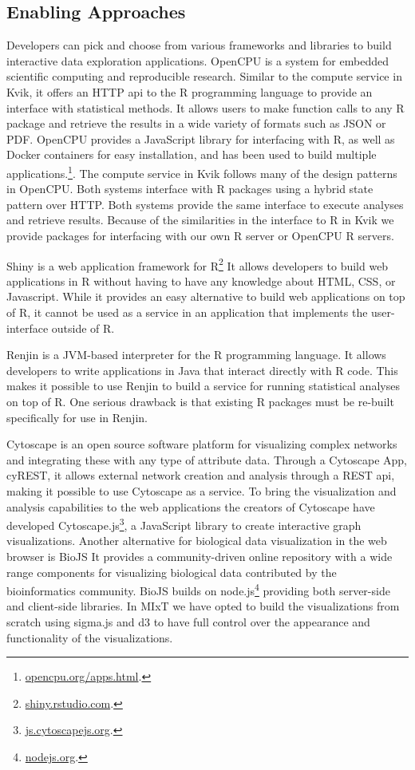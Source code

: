 \subsection{Enabling Approaches} 
Developers can pick and choose from various frameworks and libraries to build
interactive data exploration applications. 
OpenCPU is a system for embedded scientific computing and reproducible
research.\cite{opencpu} Similar to the compute service in Kvik, it offers an
HTTP \gls{api} to the R programming language to provide an interface with
statistical methods. It allows users to make function calls to any R package and
retrieve the results in a wide variety of formats such as JSON or PDF. OpenCPU
provides a JavaScript library for interfacing with R, as well as Docker
containers for easy installation, and has been used to build multiple
applications.\footnote{\url{opencpu.org/apps.html}.}. The compute service in
Kvik follows many of the design patterns in OpenCPU. Both systems interface with
R packages using a hybrid state pattern over HTTP. Both systems provide the same
interface to execute analyses and retrieve results.  Because of the similarities
in the interface to R in Kvik we provide packages for interfacing with our own R
server or OpenCPU R servers.

Shiny is a web application framework for R\footnote{\url{shiny.rstudio.com}.}
It allows developers to build web applications in R without having to have any
knowledge about HTML, CSS, or Javascript. While it provides an easy alternative
to build web applications on top of R, it cannot be used as a service in an
application that implements the user-interface outside of R.  

Renjin is a JVM-based interpreter for the R programming language.\cite{renjin}
It allows developers to write applications in Java that interact directly with R
code. This makes it possible to use Renjin to build a service for running
statistical analyses on top of R. One serious drawback is that existing R
packages must be re-built specifically for use in Renjin. 

Cytoscape is an open source software platform for visualizing complex networks
and integrating these with any type of attribute
data.\cite{shannon2003cytoscape} Through a Cytoscape App, cyREST, it allows
external network creation and analysis through a REST \gls{api}\cite{ono2015cyrest},
making it possible to use Cytoscape as a service.  To bring the visualization
and analysis capabilities to the web applications the creators of Cytoscape have
developed Cytoscape.js\footnote{\url{js.cytoscapejs.org}.}, a JavaScript library
to create interactive graph visualizations.  Another alternative for biological
data visualization in the web browser is BioJS It provides a community-driven
online repository with a wide range components for visualizing biological data
contributed by the bioinformatics community.\cite{gomez2013biojs} BioJS builds
on node.js\footnote{\url{nodejs.org}.} providing both server-side and
client-side libraries. In MIxT we have opted to build the visualizations from
scratch using sigma.js and d3 to have full control over the appearance and
functionality of the visualizations. 

